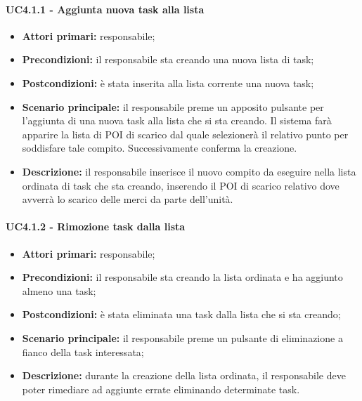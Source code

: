 \paragraph{UC4.1.1 - Aggiunta nuova task alla lista}
\begin{itemize}
	\item 	\textbf{Attori primari:} responsabile;
	\item 	\textbf{Precondizioni:} il responsabile sta creando una nuova lista di task;
	\item 	\textbf{Postcondizioni:} è stata inserita alla lista corrente una nuova task;
	\item 	\textbf{Scenario principale:} il responsabile preme un apposito pulsante per l'aggiunta di una nuova task alla lista che si sta creando. Il sistema farà apparire la lista di POI di scarico dal quale selezionerà il relativo punto per soddisfare tale compito. Successivamente conferma la creazione.
	\item 	\textbf{Descrizione:} il responsabile inserisce il nuovo compito da eseguire nella lista ordinata di task che sta creando, inserendo il POI di scarico relativo dove avverrà lo scarico delle merci da parte dell'unità.
	
\end{itemize}

\paragraph{UC4.1.2 - Rimozione task dalla lista}
\begin{itemize}
	\item 	\textbf{Attori primari:} responsabile;
	\item 	\textbf{Precondizioni:} il responsabile sta creando la lista ordinata e ha aggiunto almeno una task;
	\item 	\textbf{Postcondizioni:} è stata eliminata una task dalla lista che si sta creando;
	\item 	\textbf{Scenario principale:} il responsabile preme un pulsante di eliminazione a fianco della task interessata;
	\item 	\textbf{Descrizione:} durante la creazione della lista ordinata, il responsabile deve poter rimediare ad aggiunte errate eliminando determinate task.
\end{itemize}

